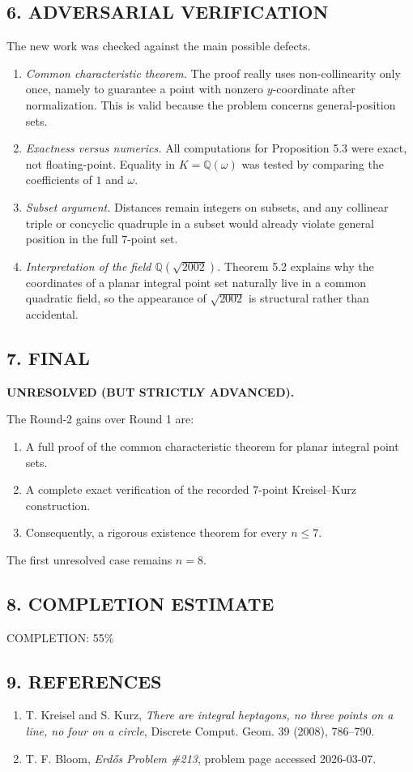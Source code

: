 \subsection*{6. ADVERSARIAL VERIFICATION}
The new work was checked against the main possible defects.
\begin{enumerate}
\item \emph{Common characteristic theorem.} The proof really uses non-collinearity only once, namely to guarantee a point with nonzero $y$-coordinate after normalization. This is valid because the problem concerns general-position sets.
\item \emph{Exactness versus numerics.} All computations for Proposition 5.3 were exact, not floating-point. Equality in $K=\mathbb{Q}(\omega)$ was tested by comparing the coefficients of $1$ and $\omega$.
\item \emph{Subset argument.} Distances remain integers on subsets, and any collinear triple or concyclic quadruple in a subset would already violate general position in the full $7$-point set.
\item \emph{Interpretation of the field $\mathbb{Q}(\sqrt{2002})$.} Theorem 5.2 explains why the coordinates of a planar integral point set naturally live in a common quadratic field, so the appearance of $\sqrt{2002}$ is structural rather than accidental.
\end{enumerate}

\subsection*{7. FINAL}
\textbf{UNRESOLVED (BUT STRICTLY ADVANCED).}

The Round-2 gains over Round 1 are:
\begin{enumerate}
\item A full proof of the common characteristic theorem for planar integral point sets.
\item A complete exact verification of the recorded $7$-point Kreisel--Kurz construction.
\item Consequently, a rigorous existence theorem for every $n\leq 7$.
\end{enumerate}

The first unresolved case remains $n=8$.

\subsection*{8. COMPLETION ESTIMATE}
COMPLETION: 55\%

\subsection*{9. REFERENCES}
\begin{enumerate}
\item T. Kreisel and S. Kurz, \emph{There are integral heptagons, no three points on a line, no four on a circle}, Discrete Comput. Geom. 39 (2008), 786--790.
\item T. F. Bloom, \emph{Erd\H{o}s Problem \#213}, problem page accessed 2026-03-07.
\end{enumerate}


